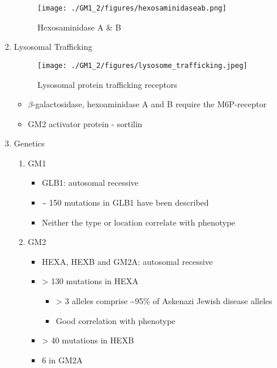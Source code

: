 \documentclass{scrartcl}
\begin{document}
\begin{enumerate}
\begin{figure}[htbp]
\centering
\texttt{[image: ./GM1\_2/figures/hexosaminidaseab.png]}
\caption{\label{fig:orge3e6bc7}
Hexosaminidase A \& B}
\end{figure}


\item Lysosomal Trafficking
\label{sec:orgc65009b}

\begin{figure}[htbp]
\centering
\texttt{[image: ./GM1\_2/figures/lysosome\_trafficking.jpeg]}
\caption{\label{fig:org4e23dd3}
Lysosomal protein trafficking receptors}
\end{figure}

\footnotesize
\begin{itemize}
\item \(\beta\)-galactosidase, hexoaminidase A and B require the M6P-receptor
\item GM2 activator protein - sortilin
\end{itemize}

\item Genetics
\label{sec:orga5a5d75}
\begin{enumerate}
\item GM1
\label{sec:org8ff3bdc}
\begin{itemize}
\item GLB1: autosomal recessive
\item \textasciitilde{} 150 mutations in GLB1 have been described
\item Neither the type or location correlate with phenotype
\end{itemize}

\item GM2
\label{sec:org7371b70}
\begin{itemize}
\item HEXA, HEXB and GM2A: autosomal recessive
\item > 130 mutations in HEXA
\begin{itemize}
\item > 3 alleles comprise \textasciitilde{}95\% of Askenazi Jewish disease alleles
\item Good correlation with phenotype
\end{itemize}
\item > 40 mutations in HEXB
\item 6 in GM2A
\end{itemize}
\end{enumerate}
\end{enumerate}
\end{document}

